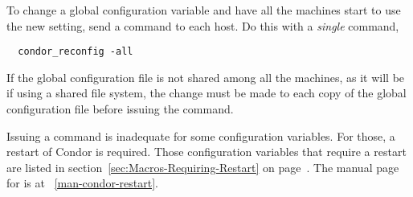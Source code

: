To change a global configuration variable and have all the
machines start to use the new setting, send a
 command to each host.
Do this with a \emph{single} command,
\begin{verbatim}
  condor_reconfig -all
\end{verbatim}

If the global configuration file is not shared among all the machines,
as it will be if using a shared file system,
the change must be made to each copy of the global configuration file
before issuing the  command.

Issuing a  command is inadequate for some
configuration variables.
For those, a restart of Condor is required.
Those configuration variables that require a restart are listed in
section~\ref{sec:Macros-Requiring-Restart}
on page~\pageref{sec:Macros-Requiring-Restart}.
The manual page for  is at
~\ref{man-condor-restart}.




